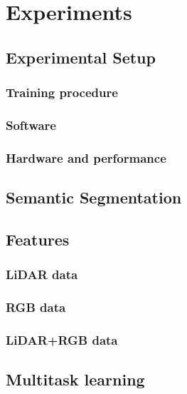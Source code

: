 \chapter{Experiments}%
\label{sec:experiments}


\section{Experimental Setup}%
\label{sec:experimental-setup}
\subsection{Training procedure}

\subsection{Software}

\subsection{Hardware and performance}


\clearpage
\section{Semantic Segmentation}%
\label{sec:specialization-project-summary}


\clearpage
\section{Features}%
\label{sec:features}

\subsection{LiDAR data}

\subsection{RGB data}

\subsection{LiDAR+RGB data}


\section{Multitask learning}\label{sec:multitask-experiments}

